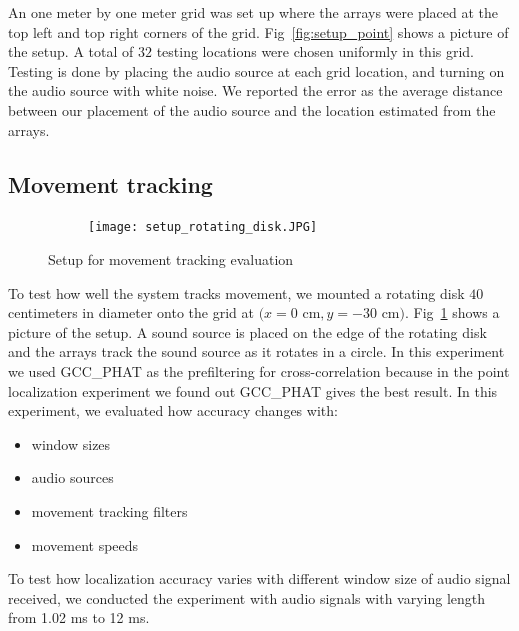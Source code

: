 An one meter by one meter grid was set up where the arrays were placed at the top left and top right corners of the grid. Fig~\ref{fig:setup_point} shows a picture of the setup. A total of $32$ testing locations were chosen uniformly in this grid. Testing is done by placing the audio source at each grid location, and turning on the audio source with white noise. We reported the error as the average distance between our placement of the audio source and the location estimated from the arrays.

\subsection{Movement tracking}

\begin{figure}[h!]
  \centering
  \begin{subfigure}[]{1.0\textwidth}
    \texttt{[image: setup\_rotating\_disk.JPG]}
  \end{subfigure}
  \caption{Setup for movement tracking evaluation}
  \label{fig:setup_circle}
\end{figure}


To test how well the system tracks movement, we mounted a rotating disk $40$ centimeters in diameter onto the grid at $(x=0$ cm$, y=-30$ cm$)$. Fig~\ref{fig:setup_circle} shows a picture of the setup. A sound source is placed on the edge of the rotating disk and the arrays track the sound source as it rotates in a circle. In this experiment we used GCC\_PHAT as the prefiltering for cross-correlation because in the point localization experiment we found out GCC\_PHAT gives the best result. In this experiment, we evaluated how accuracy changes with:
\begin{itemize}
\item window sizes 
\item audio sources
\item movement tracking filters
\item movement speeds
\end{itemize}

To test how localization accuracy varies with different window size of audio signal received, we conducted the experiment with audio signals with varying length from 1.02 ms to 12 ms.

